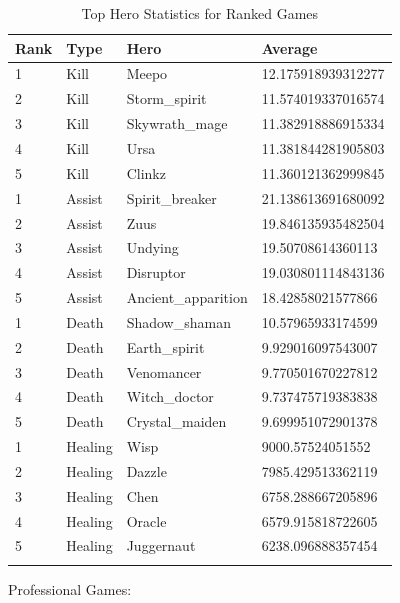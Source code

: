 \documentclass{article}
\begin{document}
\begin{longtable}{|p{1.5cm}|p{2cm}|p{3cm}|p{4.5cm}|}

\hline
\textbf{Rank} & \textbf{Type} & \textbf{Hero} & \textbf{Average} \\
\hline
\endhead

1 & Kill & Meepo & 12.175918939312277 \\\hline
2 & Kill & Storm\_spirit & 11.574019337016574 \\\hline
3 & Kill & Skywrath\_mage & 11.382918886915334 \\\hline
4 & Kill & Ursa & 11.381844281905803 \\\hline
5 & Kill & Clinkz & 11.360121362999845 \\\hline
1 & Assist & Spirit\_breaker & 21.138613691680092 \\\hline
2 & Assist & Zuus & 19.846135935482504 \\\hline
3 & Assist & Undying & 19.50708614360113 \\\hline
4 & Assist & Disruptor & 19.030801114843136 \\\hline
5 & Assist & Ancient\_apparition & 18.42858021577866 \\\hline
1 & Death & Shadow\_shaman & 10.57965933174599 \\\hline
2 & Death & Earth\_spirit & 9.929016097543007 \\\hline
3 & Death & Venomancer & 9.770501670227812 \\\hline
4 & Death & Witch\_doctor & 9.737475719383838 \\\hline
5 & Death & Crystal\_maiden & 9.699951072901378 \\\hline
1 & Healing & Wisp & 9000.57524051552 \\\hline
2 & Healing & Dazzle & 7985.429513362119 \\\hline
3 & Healing & Chen & 6758.288667205896 \\\hline
4 & Healing & Oracle & 6579.915818722605 \\\hline
5 & Healing & Juggernaut & 6238.096888357454 \\\hline


\caption{Top Hero Statistics for Ranked Games}
\label{top-hero-statistics-for-ranked-games}
\end{longtable}


Professional Games:
\end{document}
